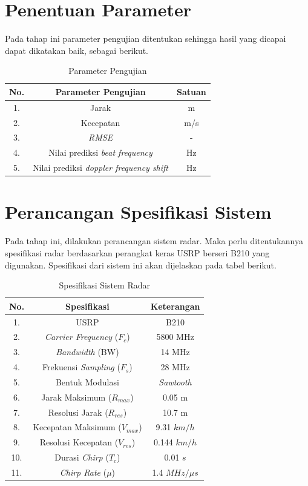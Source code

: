 \section{Penentuan Parameter}

Pada tahap ini parameter pengujian ditentukan sehingga hasil yang dicapai dapat dikatakan baik, sebagai berikut.

\begin{center}
	\begin{longtable}{| c | c | c |}
		\caption{Parameter Pengujian}
		\label{tab:paramUji}\\
		\hline
		No. & Parameter Pengujian		& Satuan\\ \hline
		1.  &Jarak	   					& m\\
		2.  &Kecepatan 					& m/s\\
		3.  &\textit{RMSE}				& -\\
		4.	&Nilai prediksi \textit{beat frequency}	& Hz \\
		5.	&Nilai prediksi \textit{doppler frequency shift} & Hz \\
		\hline
	\end{longtable}
\end{center}

\section{Perancangan Spesifikasi Sistem}
Pada tahap ini, dilakukan perancangan sistem radar. Maka perlu ditentukannya spesifikasi radar berdasarkan perangkat keras USRP berseri B210 yang digunakan.  Spesifikasi dari sistem ini akan dijelaskan pada tabel berikut.

\begin{center}
	\begin{longtable}{| c | c | c |}
		\caption{Spesifikasi Sistem Radar}
		\label{tab:spekRadar}\\
		\hline
		No. & Spesifikasi 								& Keterangan\\\hline
		1.  & USRP 										& B210\\
		2.  & \textit{Carrier Frequency} ($F_{c}$) 		& 5800 MHz \\
		3.  & \textit{Bandwidth} 	(BW)				& 14 MHz \\
		4.	& Frekuensi \textit{Sampling}	($F_{s}$)	& 28 MHz	\\
		5.	& Bentuk Modulasi							& \textit{Sawtooth}\\
		6.  & Jarak Maksimum 		($R_{max}$)			& 0.05 m \\
		7.  & Resolusi Jarak 		($R_{res}$)			& 10.7 m \\
		8.  & Kecepatan Maksimum	($V_{max}$)			& 9.31 $km/h$ \\
		9.  & Resolusi Kecepatan 	($V_{res}$)			& 0.144 $km/h$\\
		10.	& Durasi \textit{Chirp}	($T_{c}$)			& 0.01 $s$\\
		11.	& \textit{Chirp Rate}	($\mu$)				& 1.4 $MHz/\mu s$\\
		\hline
	\end{longtable}
\end{center}

